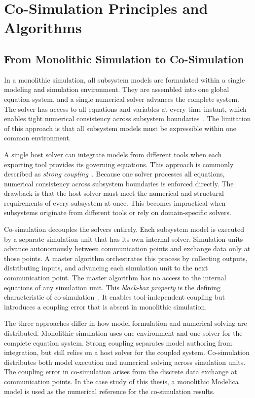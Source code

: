 \section{Co-Simulation Principles and Algorithms}
\label{sec:23_co_simulation}

\subsection{From Monolithic Simulation to Co-Simulation}
\label{sec:231_monolithic_to_cosimulation}

In a monolithic simulation, all subsystem models are formulated within a single modeling and simulation environment.
They are assembled into one global equation system, and a single numerical solver advances the complete system.
The solver has access to all equations and variables at every time instant, which enables tight numerical consistency across subsystem boundaries~\cite{Modelica_Fritzson}.
The limitation of this approach is that all subsystem models must be
expressible within one common environment.

A single host solver can integrate models from different tools when each exporting tool provides its governing equations.
This approach is commonly described as \emph{strong coupling}~\cite{kubler_two_2000,gomes_co-simulation_2019}.
Because one solver processes all equations, numerical consistency across subsystem boundaries is enforced directly.
The drawback is that the host solver must meet the numerical and structural requirements of every subsystem at once.
This becomes impractical when subsystems originate from different tools or rely on domain-specific solvers.

Co-simulation decouples the solvers entirely.
Each subsystem model is executed by a separate simulation unit that has its own internal solver.
Simulation units advance autonomously between communication points and exchange data only at those points.
A master algorithm orchestrates this process by collecting outputs, distributing inputs, and advancing each simulation unit to the next communication point.
The master algorithm has no access to the internal equations of any simulation unit.
This \emph{black-box property} is the defining characteristic of co-simulation~\cite{gomes_co-simulation_2019}.
It enables tool-independent coupling but introduces a coupling error that is absent in monolithic simulation.

The three approaches differ in how model formulation and numerical solving are distributed.
Monolithic simulation uses one environment and one solver for the complete equation system.
Strong coupling separates model authoring from integration, but still relies on a host solver for the coupled system.
Co-simulation distributes both model execution and numerical solving across simulation units.
The coupling error in co-simulation arises from the discrete data exchange at communication points.
In the case study of this thesis, a monolithic Modelica model is used as the numerical reference for the co-simulation results.

